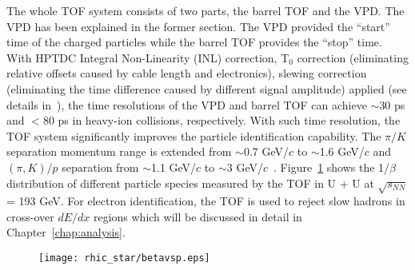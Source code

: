 The whole TOF system consists of two parts, the barrel TOF and the VPD. The VPD has been explained in the former section. The VPD provided the ``start'' time of the charged particles while the barrel TOF provides the ``stop'' time. With HPTDC Integral Non-Linearity (INL) correction, T$_{0}$ correction (eliminating relative offsets caused by cable length and electronics), slewing correction (eliminating the time difference caused by different signal amplitude) applied (see details in~\cite{VPDdet,VPDTOFcalib0, VPDTOFcalib1}), the time resolutions of the VPD and barrel TOF can achieve $\sim$30 ps and $<$80 ps in heavy-ion collisions, respectively. With such time resolution, the TOF system significantly improves the particle identification capability. The $\pi/K$ separation momentum range is extended from $\sim$0.7 GeV/$c$ to $\sim$1.6 GeV/$c$ and $(\pi,K)/p$ separation from $\sim$1.1 GeV/$c$ to $\sim$3 GeV/$c$~\cite{tofpid}. Figure~\ref{tofbeta} shows the 1/$\beta$ distribution of different particle species measured by the TOF in U + U at $\sqrt{s_{NN}}$ = 193 GeV. For electron identification, the TOF is used to reject slow hadrons in cross-over $dE/dx$ regions which will be discussed in detail in Chapter~\ref{chap:analysis}. 

\begin{figure}[htbp]
\centering
\texttt{[image: rhic\_star/betavsp.eps]}
 \label{tofbeta}
\end{figure}


